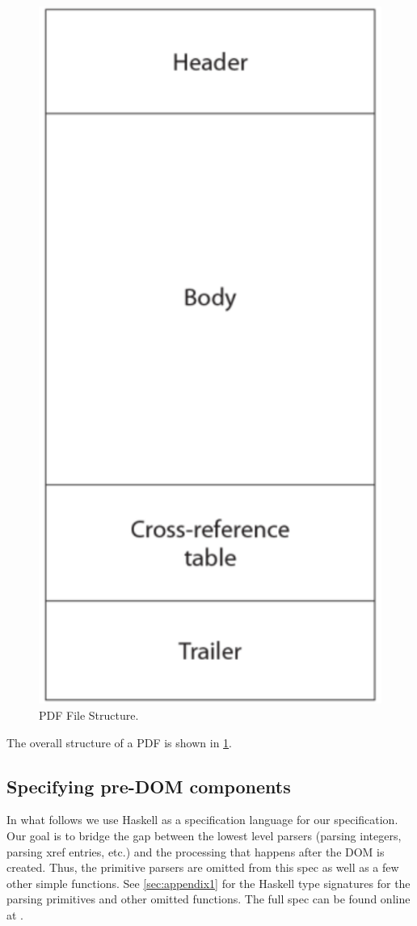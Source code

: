 \begin{figure}[t]
    \centering
    \includegraphics[width=0.35\linewidth]{figures/pdf-structure.png}
    \caption{PDF File Structure.}
    \label{fig:pdf-structure}
\end{figure}

The overall structure of a PDF is shown in \cref{fig:pdf-structure}.

  
\subsection{Specifying pre-DOM components}

In what follows we use Haskell \cite{Haskell} as a specification language for
our specification.
%
Our goal is to bridge the gap between the lowest level parsers
(parsing integers, parsing xref entries, etc.) and the processing
that happens after the DOM is created.   Thus, the primitive parsers
are omitted from this spec as well as a few other simple functions.
See \cref{sec:appendix1} for the Haskell type signatures for
the parsing primitives and other omitted functions.
The full spec can be found online at .

